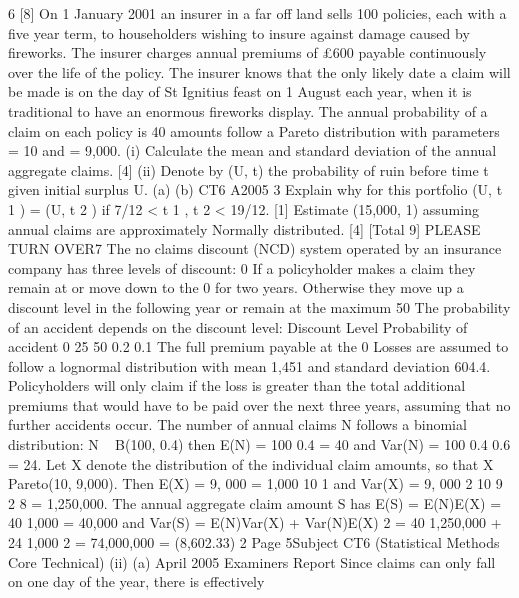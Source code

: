 \documentclass[a4paper,12pt]{article}
\begin{document}
\begin{enumerate}

6
[8]
On 1 January 2001 an insurer in a far off land sells 100 policies, each with a five year
term, to householders wishing to insure against damage caused by fireworks. The
insurer charges annual premiums of £600 payable continuously over the life of the
policy.
The insurer knows that the only likely date a claim will be made is on the day of
St Ignitius feast on 1 August each year, when it is traditional to have an enormous
fireworks display. The annual probability of a claim on each policy is 40%
amounts follow a Pareto distribution with parameters = 10 and = 9,000.
(i) Calculate the mean and standard deviation of the annual aggregate claims. [4]
(ii) Denote by (U, t) the probability of ruin before time t given initial surplus U.
(a)
(b)
CT6 A2005
3
Explain why for this portfolio (U, t 1 ) = (U, t 2 ) if
7/12 < t 1 , t 2 < 19/12.
[1]
Estimate (15,000, 1) assuming annual claims are approximately
Normally distributed.
[4]
[Total 9]
PLEASE TURN OVER7
The no claims discount (NCD) system operated by an insurance company has three
levels of discount: 0%
If a policyholder makes a claim they remain at or move down to the 0%
for two years. Otherwise they move up a discount level in the following year or
remain at the maximum 50%
The probability of an accident depends on the discount level:
Discount Level Probability of accident
0%
25%
50%
0.2
0.1
The full premium payable at the 0%
Losses are assumed to follow a lognormal distribution with mean 1,451 and standard
deviation 604.4.
Policyholders will only claim if the loss is greater than the total additional premiums
that would have to be paid over the next three years, assuming that no further
accidents occur.
The number of annual claims N follows a binomial distribution:
N ~ B(100, 0.4) then
E(N) = 100
0.4 = 40
and
Var(N) = 100
0.4
0.6 = 24.
Let X denote the distribution of the individual claim amounts, so that X ~
Pareto(10, 9,000). Then
E(X) =
9, 000
= 1,000
10 1
and
Var(X) =
9, 000 2 10
9 2 8
= 1,250,000.
The annual aggregate claim amount S has
E(S) = E(N)E(X) = 40
1,000 = 40,000
and
Var(S) = E(N)Var(X) + Var(N)E(X) 2
= 40
1,250,000 + 24
1,000 2
= 74,000,000
= (8,602.33) 2
Page 5Subject CT6 (Statistical Methods Core Technical)
(ii)
(a)
April 2005
Examiners Report
Since claims can only fall on one day of the year, there is effectively

\end{enumerate}
\end{document}
